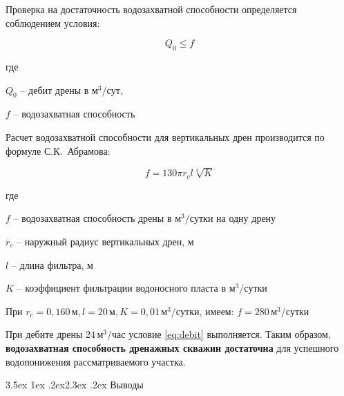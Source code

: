 \documentclass[a4paper,12pt]{article} %
\makeatletter
\renewcommand\section{\@startsection {section}{1}{\parindent}%
	{3.5ex \@plus 1ex \@minus .2ex}{2.3ex \@plus.2ex}%
	{\normalfont\hyphenpenalty=10000\Large\bfseries}}
\makeatother
\begin{document}
Проверка на достаточность водозахватной способности определяется соблюдением условия:

\begin{equation}\label{eq:debit}
	Q_0 \leqslant f 
\end{equation}

	где 
	
	$Q_0$ -- дебит дрены в $м^3/сут$, 
	
	$f$ -- водозахватная способность

	\bigskip

Расчет водозахватной способности  для вертикальных дрен производится по формуле \mbox{С.К. Абрамова}:

\begin{equation}\label{eq:abramov}
	f = 130 \pi r_c l \sqrt[3]{K}
\end{equation}

	где 

	$f$ -- водозахватная способность дрены в $м^3/сутки$ на одну дрену
	
	$r_c$ -- наружный радиус вертикальных дрен, м
	
	$l$ -- длина фильтра, м
	
	$K$ -- коэффициент фильтрации водоносного пласта в $м^3/сутки$
	
	\bigskip
	
	При $r_c = 0,160 \, м, l = 20 \, м, K = 0,01 \, м^3/сутки $, имеем: $f = 280 \, м^3 / сутки$

	\bigskip
	
При дебите дрены $24 \, м^3/час$ условие \eqref{eq:debit} выполняется. Таким образом, \textbf{водозахватная способность дренажных скважин достаточна} для успешного водопонижения рассматриваемого участка.

\section{Выводы}
\end{document}
